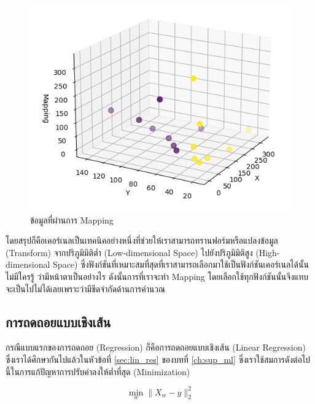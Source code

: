\begin{figure}[H]
    \centering
    \includegraphics[width=0.9\linewidth]{fig/kernel_mapping.png}
    \caption{ข้อมูลที่ผ่านการ Mapping}
    \label{fig:kernel_mapping}
\end{figure}

\vspace{1em}
โดยสรุปก็คือเคอร์เนลเป็นเทคนิคอย่างหนึ่งที่ช่วยให้เราสามารถทรานฟอร์มหรือแปลงข้อมูล (Transform) จากปริภูมิมิติต่ำ (Low-dimensional
Space) ไปยังปริภูมิมิติสูง (High-dimensional Space) ซึ่งฟังก์ชันที่เหมาะสมที่สุดที่เราสามารถเลือกมาใช้เป็นฟังก์ชันเคอร์เนลได้นั้นไม่มีใครรู้%
ว่ามีหน้าตาเป็นอย่างไร ดังนั้นการที่เราจะทำ Mapping โดยเลือกใช้ทุกฟังก์ชันนั้นจึงแทบจะเป็นไปไม่ได้เลยเพราะว่ามีขีดจำกัดด้านการคำนวณ

\subsection{การถดถอยแบบเชิงเส้น}
\label{ssec:lin_reg}

กรณีแบบแรกของการถดถอย (Regression) ก็คือการถดถอยแบบเชิงเส้น (Linear Regression) ซึ่งเราได้ศึกษากันไปแล้วในหัวข้อที่
\ref{sec:lin_res} ของบทที่ \ref{ch:sup_ml} ซึ่งเราใช้สมการดังต่อไปนี้ในการแก้ปัญหาการปรับค่าลงให้ต่ำที่สุด (Minimization)

\begin{equation}
    \min_{w} \lVert X_{w} - y \rVert_{2}^{2}
\end{equation}

